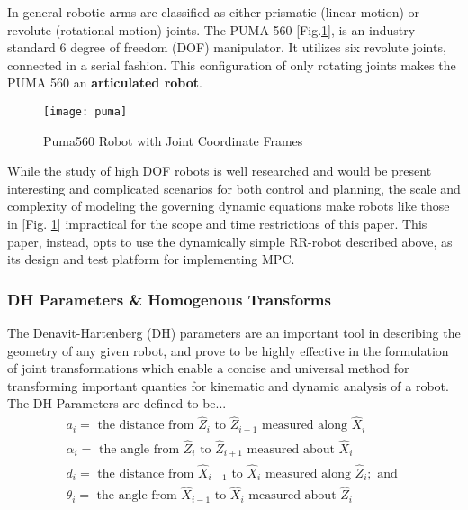 \documentclass[journal]{IEEEtran}
\begin{document}
In general robotic arms are classified as either prismatic (linear motion) or revolute (rotational motion) joints. The PUMA 560 [Fig.\ref{puma560}], is an industry standard 6 degree of freedom (DOF) manipulator. It utilizes six revolute joints, connected in a serial fashion. This configuration of only rotating joints makes the PUMA 560 an \textbf{articulated robot}.

\begin{figure}
    \centering
    \texttt{[image: puma]}
    \caption{Puma560 Robot with Joint Coordinate Frames}
    \label{puma560}
\end{figure}

While the study of high DOF robots is well researched and would be present interesting and complicated scenarios for both control and planning, the scale and complexity of modeling the governing dynamic equations make robots like those in [Fig. \ref{puma560}] impractical for the scope and time restrictions of this paper. This paper, instead, opts to use the dynamically simple RR-robot described above, as its design and test platform for implementing MPC.\\



\subsubsection{DH Parameters \& Homogenous Transforms}

The Denavit-Hartenberg (DH) parameters are an important tool in describing the geometry of any given robot, and prove to be highly effective in the formulation of joint transformations which enable a concise and universal method for transforming important quanties for kinematic and dynamic analysis of a robot.\\

\noindent The DH Parameters are defined to be...
    $$
    \begin{array}{l}
    a_{i}=\text { the distance from } \hat{Z}_{i} \text { to } \hat{Z}_{i+1} \text { measured along } \hat{X}_{i} \\
    \alpha_{i}=\text { the angle from } \hat{Z}_{i} \text { to } \hat{Z}_{i+1} \text { measured about } \hat{X}_{i} \\
    d_{i}=\text { the distance from } \hat{X}_{i-1} \text { to } \hat{X}_{i} \text { measured along } \hat{Z}_{i} ; \text { and } \\
    \theta_{i}=\text { the angle from } \hat{X}_{i-1} \text { to } \hat{X}_{i} \text { measured about } \hat{Z}_{i}
    \end{array}
    $$
\end{document}

